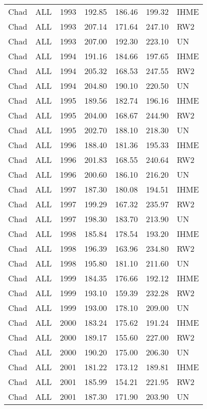 \begin{longtable}{lllrrrl}
  Chad & ALL & 1993 & 192.85 & 186.46 & 199.32 & IHME \\ 
  Chad & ALL & 1993 & 207.14 & 171.64 & 247.10 & RW2 \\ 
  Chad & ALL & 1993 & 207.00 & 192.30 & 223.10 & UN \\ 
  Chad & ALL & 1994 & 191.16 & 184.66 & 197.65 & IHME \\ 
  Chad & ALL & 1994 & 205.32 & 168.53 & 247.55 & RW2 \\ 
  Chad & ALL & 1994 & 204.80 & 190.10 & 220.50 & UN \\ 
  Chad & ALL & 1995 & 189.56 & 182.74 & 196.16 & IHME \\ 
  Chad & ALL & 1995 & 204.00 & 168.67 & 244.90 & RW2 \\ 
  Chad & ALL & 1995 & 202.70 & 188.10 & 218.30 & UN \\ 
  Chad & ALL & 1996 & 188.40 & 181.36 & 195.33 & IHME \\ 
  Chad & ALL & 1996 & 201.83 & 168.55 & 240.64 & RW2 \\ 
  Chad & ALL & 1996 & 200.60 & 186.10 & 216.20 & UN \\ 
  Chad & ALL & 1997 & 187.30 & 180.08 & 194.51 & IHME \\ 
  Chad & ALL & 1997 & 199.29 & 167.32 & 235.97 & RW2 \\ 
  Chad & ALL & 1997 & 198.30 & 183.70 & 213.90 & UN \\ 
  Chad & ALL & 1998 & 185.84 & 178.54 & 193.20 & IHME \\ 
  Chad & ALL & 1998 & 196.39 & 163.96 & 234.80 & RW2 \\ 
  Chad & ALL & 1998 & 195.80 & 181.10 & 211.60 & UN \\ 
  Chad & ALL & 1999 & 184.35 & 176.66 & 192.12 & IHME \\ 
  Chad & ALL & 1999 & 193.10 & 159.39 & 232.28 & RW2 \\ 
  Chad & ALL & 1999 & 193.00 & 178.10 & 209.00 & UN \\ 
  Chad & ALL & 2000 & 183.24 & 175.62 & 191.24 & IHME \\ 
  Chad & ALL & 2000 & 189.17 & 155.60 & 227.00 & RW2 \\ 
  Chad & ALL & 2000 & 190.20 & 175.00 & 206.30 & UN \\ 
  Chad & ALL & 2001 & 181.22 & 173.12 & 189.81 & IHME \\ 
  Chad & ALL & 2001 & 185.99 & 154.21 & 221.95 & RW2 \\ 
  Chad & ALL & 2001 & 187.30 & 171.90 & 203.90 & UN \\ 

\end{longtable}
